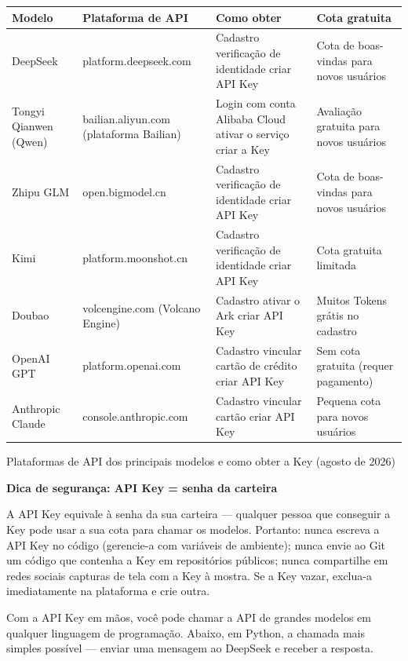 \begin{center}
\begin{tabularx}{\linewidth}{|X|X|X|X|}
\hline
\textbf{Modelo} & \textbf{Plataforma de API} & \textbf{Como obter} & \textbf{Cota gratuita} \tabularnewline
\hline
DeepSeek & platform.deepseek.com & Cadastro verificação de identidade criar API Key & Cota de boas-vindas para novos usuários \tabularnewline
Tongyi Qianwen (Qwen) & bailian.aliyun.com (plataforma Bailian) & Login com conta Alibaba Cloud ativar o serviço criar a Key & Avaliação gratuita para novos usuários \tabularnewline
Zhipu GLM & open.bigmodel.cn & Cadastro verificação de identidade criar API Key & Cota de boas-vindas para novos usuários \tabularnewline
Kimi & platform.moonshot.cn & Cadastro verificação de identidade criar API Key & Cota gratuita limitada \tabularnewline
Doubao & volcengine.com (Volcano Engine) & Cadastro ativar o Ark criar API Key & Muitos Tokens grátis no cadastro \tabularnewline
OpenAI GPT & platform.openai.com & Cadastro vincular cartão de crédito criar API Key & Sem cota gratuita (requer pagamento) \tabularnewline
Anthropic Claude & console.anthropic.com & Cadastro vincular cartão criar API Key & Pequena cota para novos usuários \tabularnewline
\hline
\end{tabularx}
\end{center}

\begin{center}\small\color{gray}Plataformas de API dos principais modelos e como obter a Key (agosto de 2026)\end{center}

\textbf{Dica de segurança: API Key = senha da carteira}\par

A API Key equivale à senha da sua carteira — qualquer pessoa que conseguir a Key pode usar a sua cota para chamar os modelos. Portanto: nunca escreva a API Key no código (gerencie-a com variáveis de ambiente); nunca envie ao Git um código que contenha a Key em repositórios públicos; nunca compartilhe em redes sociais capturas de tela com a Key à mostra. Se a Key vazar, exclua-a imediatamente na plataforma e crie outra.


Com a API Key em mãos, você pode chamar a API de grandes modelos em qualquer linguagem de programação. Abaixo, em Python, a chamada mais simples possível — enviar uma mensagem ao DeepSeek e receber a resposta.

